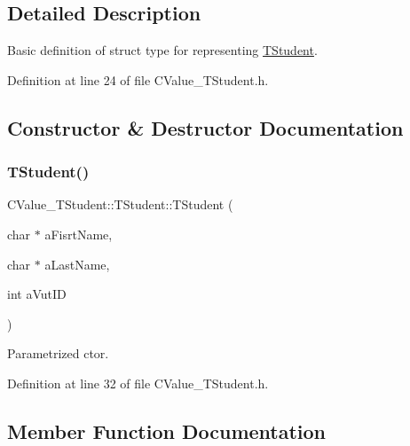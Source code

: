 \subsection{Detailed Description}
Basic definition of struct type for representing \hyperlink{struct_c_value___t_student_1_1_t_student}{T\+Student}. 

Definition at line 24 of file C\+Value\+\_\+\+T\+Student.\+h.



\subsection{Constructor \& Destructor Documentation}
\mbox{\label{struct_c_value___t_student_1_1_t_student_ae052eac687165ae925ca2a15bccc9d95}} 
\subsubsection{\texorpdfstring{T\+Student()}{TStudent()}}
{\footnotesize\ttfamily C\+Value\+\_\+\+T\+Student\+::\+T\+Student\+::\+T\+Student (\begin{DoxyParamCaption}\item[{char $\ast$}]{a\+Fisrt\+Name,  }\item[{char $\ast$}]{a\+Last\+Name,  }\item[{int}]{a\+Vut\+ID }\end{DoxyParamCaption})\hspace{0.3cm}{\ttfamily [inline]}}



Parametrized c\textquotesingle{}tor. 



Definition at line 32 of file C\+Value\+\_\+\+T\+Student.\+h.



\subsection{Member Function Documentation}
\mbox{\label{struct_c_value___t_student_1_1_t_student_aaadc7d5525e434de77c6874052174903}} 
